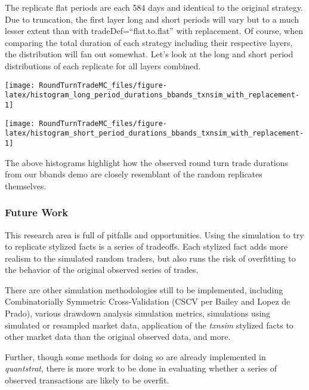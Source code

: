 The replicate flat periods are each 584 days and identical to the
original strategy. Due to truncation, the first layer long and short
periods will vary but to a much lesser extent than with
tradeDef=``flat.to.flat'' with replacement. Of course, when comparing
the total duration of each strategy including their respective layers,
the distribution will fan out somewhat. Let's look at the long and short
period distributions of each replicate for all layers combined.

\begin{Schunk}

\texttt{[image: RoundTurnTradeMC\_files/figure-latex/histogram\_long\_period\_durations\_bbands\_txnsim\_with\_replacement-1]} \end{Schunk}

\begin{Schunk}

\texttt{[image: RoundTurnTradeMC\_files/figure-latex/histogram\_short\_period\_durations\_bbands\_txnsim\_with\_replacement-1]} \end{Schunk}

The above histograms highlight how the observed round turn trade
durations from our bbands demo are closely resemblant of the random
replicates themselves.

\hypertarget{future-work}{%
\subsubsection{Future Work}\label{future-work}}

This research area is full of pitfalls and opportunities. Using the
simulation to try to replicate stylized facts is a series of tradeoffs.
Each stylized fact adds more realism to the simulated random traders,
but also runs the risk of overfitting to the behavior of the original
observed series of trades.

There are other simulation methodologies still to be implemented,
including Combinatorially Symmetric Cross-Validation (CSCV per Bailey
and Lopez de Prado), various drawdown analysis simulation metrics,
simulations using simulated or resampled market data, application of the
\emph{txnsim} stylized facts to other market data than the original
observed data, and more.

Further, though some methods for doing so are already implemented in
\emph{quantstrat}, there is more work to be done in evaluating whether a
series of observed transactions are likely to be overfit.


